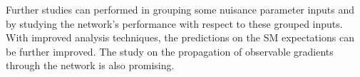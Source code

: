 Further studies can performed in grouping some nuisance parameter inputs and by studying the network's performance with respect to these grouped inputs. With improved analysis techniques, the predictions on the SM expectations can be further improved. The study on the propagation of observable gradients through the network is also promising.